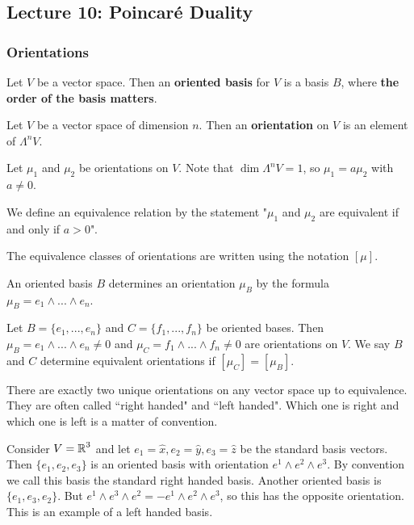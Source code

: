 \subsection{Lecture 10: Poincar\'e Duality}
\subsubsection{Orientations}
\begin{defn} Let $V$ be a vector space. Then an \textbf{oriented basis} for $V$ is a basis $B$, where \textbf{the order of the basis matters}. 
\end{defn}
\begin{defn}[Orientation] Let $V$ be a vector space of dimension $n$. Then an \textbf{orientation} on $V$ is an element of $\Lambda^n V$.
\end{defn}
\begin{defn}
    Let $\mu_1$ and $\mu_2$ be orientations on $V$. Note that $\dim \Lambda^n V = 1$, so $\mu_1 = a \mu_2$ with $a\neq 0$.

    We define an equivalence relation by the statement "$\mu_1$ and $\mu_2$ are equivalent if and only if $a>0$".

    The equivalence classes of orientations are written using the notation $[\mu]$.
\end{defn}
\begin{remark*}
    An oriented basis $B$ determines an orientation $\mu_B$ by the formula $\mu_B = e_1\wedge...\wedge e_n$.
\end{remark*}
\begin{defn}
    Let $B=\{e_1,...,e_n\}$ and $C=\{f_1,...,f_n\}$ be oriented bases. Then $\mu_B = e_1\wedge...\wedge e_n\neq 0$ and $\mu_C = f_1\wedge...\wedge f_n\neq 0$ are orientations on $V$. We say $B$ and $C$ determine equivalent orientations if $[\mu_C] = [\mu_B]$.
\end{defn}
\begin{remark*}
    There are exactly two unique orientations on any vector space up to equivalence. They are often called ``right handed" and ``left handed". Which one is right and which one is left is a matter of convention.
\end{remark*}
\begin{example}
    Consider $V = \operatorname{\mathbb{R}}^3$ and let $e_1=\hat{x},e_2=\hat{y},e_3=\hat{z}$ be the standard basis vectors. Then $\{e_1,e_2,e_3\}$ is an oriented basis with orientation $e^1\wedge e^2\wedge e^3$. By convention we call this basis the standard right handed basis. Another oriented basis is $\{e_1,e_3,e_2\}$. But $e^1\wedge e^3 \wedge e^2 = -e^1\wedge e^2\wedge e^3$, so this has the opposite orientation. This is an example of a left handed basis.
\end{example}
